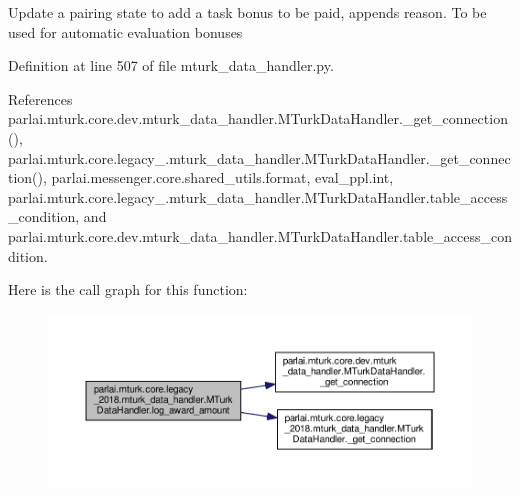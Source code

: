 \begin{DoxyVerb}Update a pairing state to add a task bonus to be paid,
appends reason. To be used for automatic evaluation bonuses
\end{DoxyVerb}
 

Definition at line 507 of file mturk\+\_\+data\+\_\+handler.\+py.



References parlai.\+mturk.\+core.\+dev.\+mturk\+\_\+data\+\_\+handler.\+M\+Turk\+Data\+Handler.\+\_\+get\+\_\+connection(), parlai.\+mturk.\+core.\+legacy\+\_.\+mturk\+\_\+data\+\_\+handler.\+M\+Turk\+Data\+Handler.\+\_\+get\+\_\+connection(), parlai.\+messenger.\+core.\+shared\+\_\+utils.\+format, eval\+\_\+ppl.\+int, parlai.\+mturk.\+core.\+legacy\+\_.\+mturk\+\_\+data\+\_\+handler.\+M\+Turk\+Data\+Handler.\+table\+\_\+access\+\_\+condition, and parlai.\+mturk.\+core.\+dev.\+mturk\+\_\+data\+\_\+handler.\+M\+Turk\+Data\+Handler.\+table\+\_\+access\+\_\+condition.

Here is the call graph for this function\+:
\nopagebreak
\begin{figure}[H]
\begin{center}
\leavevmode
\includegraphics[width=350pt]{classparlai_1_1mturk_1_1core_1_1legacy__2018_1_1mturk__data__handler_1_1MTurkDataHandler_aa6003d72e64397b5d7ad10018c9ab1ff_cgraph}
\end{center}
\end{figure}
\mbox{\label{classparlai_1_1mturk_1_1core_1_1legacy__2018_1_1mturk__data__handler_1_1MTurkDataHandler_ad690660ac58d15ce83f0801b999f946e}} 
